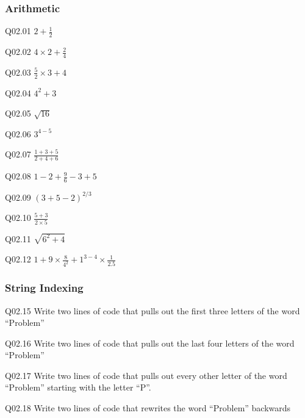 \documentclass{book}
\newenvironment{problems}{}{}  %
\begin{document}
    
        \begin{problems}
        \hypertarget{arithmetic}{%
\subsubsection{Arithmetic}\label{arithmetic}}

Q02.01 \(2 + \frac{1}{2}\)

Q02.02 \(4 \times 2 + \frac{2}{4}\)

Q02.03 \(\frac{5}{2} \times 3 + 4\)

Q02.04 \(4^2 + 3\)

Q02.05 \(\sqrt{16}\)

Q02.06 \(3^{4-5}\)

Q02.07 \(\frac{1+3+5}{2+4+6}\)

Q02.08 \(1 - 2 + \frac{9}{6} -3 + 5\)

Q02.09 \((3 + 5 -2)^{2/3}\)

Q02.10 \(\frac{5+3}{2 \times 5}\)

Q02.11 \(\sqrt{6^2 + 4}\)

Q02.12 \(1 + 9 \times \frac{8}{4^2} + 1^{3-4} \times \frac{1}{2.5}\)
        \end{problems}

    




    
        \hypertarget{string-indexing}{%
\subsubsection{String Indexing}\label{string-indexing}}

Q02.15 Write two lines of code that pulls out the first three letters of
the word ``Problem''

Q02.16 Write two lines of code that pulls out the last four letters of
the word ``Problem''

Q02.17 Write two lines of code that pulls out every other letter of the
word ``Problem'' starting with the letter ``P''.

Q02.18 Write two lines of code that rewrites the word ``Problem''
backwards
    
\end{document}
